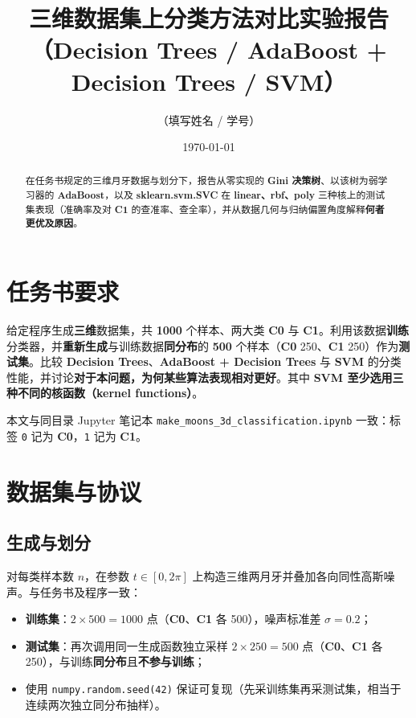 \documentclass[UTF8,a4paper,11pt]{ctexart}
\title{三维数据集上分类方法对比实验报告\\（Decision Trees / AdaBoost + Decision Trees / SVM）}
\author{（填写姓名 / 学号）}
\date{\today}
\begin{document}
\maketitle

\begin{abstract}
在任务书规定的三维月牙数据与划分下，报告从零实现的 \textbf{Gini 决策树}、以该树为弱学习器的 \textbf{AdaBoost}，以及 \textbf{sklearn.svm.SVC} 在 \textbf{linear、rbf、poly} 三种核上的测试集表现（准确率及对 \textbf{C1} 的查准率、查全率），并从数据几何与归纳偏置角度解释\textbf{何者更优及原因}。
\end{abstract}

\section{任务书要求}
给定程序生成\textbf{三维}数据集，共 \textbf{1000} 个样本、两大类 \textbf{C0} 与 \textbf{C1}。利用该数据\textbf{训练}分类器，并\textbf{重新生成}与训练数据\textbf{同分布}的 \textbf{500} 个样本（\textbf{C0} 250、\textbf{C1} 250）作为\textbf{测试集}。比较 \textbf{Decision Trees}、\textbf{AdaBoost + Decision Trees} 与 \textbf{SVM} 的分类性能，并讨论\textbf{对于本问题，为何某些算法表现相对更好}。其中 \textbf{SVM 至少选用三种不同的核函数（kernel functions）}。

本文与同目录 Jupyter 笔记本 \texttt{make\_moons\_3d\_classification.ipynb} 一致：标签 \texttt{0} 记为 \textbf{C0}，\texttt{1} 记为 \textbf{C1}。

\section{数据集与协议}
\subsection{生成与划分}
对每类样本数 $n$，在参数 $t \in [0, 2\pi]$ 上构造三维两月牙并叠加各向同性高斯噪声。与任务书及程序一致：
\begin{itemize}
  \item \textbf{训练集}：$2 \times 500 = 1000$ 点（\textbf{C0}、\textbf{C1} 各 500），噪声标准差 $\sigma = 0.2$；
  \item \textbf{测试集}：再次调用同一生成函数独立采样 $2 \times 250 = 500$ 点（\textbf{C0}、\textbf{C1} 各 250），与训练\textbf{同分布}且\textbf{不参与训练}；
  \item 使用 \texttt{numpy.random.seed(42)} 保证可复现（先采训练集再采测试集，相当于连续两次独立同分布抽样）。
\end{itemize}
\end{document}
